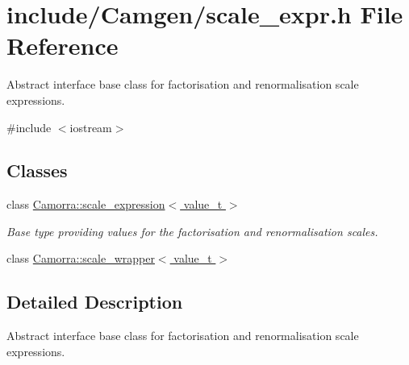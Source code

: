 \hypertarget{a00597}{
\section{include/Camgen/scale\_\-expr.h File Reference}
\label{a00597}
}


Abstract interface base class for factorisation and renormalisation scale expressions.  


{\ttfamily \#include $<$iostream$>$}\par
\subsection*{Classes}
\begin{DoxyCompactItemize}
\item 
class \hyperlink{a00447}{Camorra::scale\_\-expression$<$ value\_\-t $>$}
\begin{DoxyCompactList}\small\item\em Base type providing values for the factorisation and renormalisation scales. \end{DoxyCompactList}\item 
class \hyperlink{a00448}{Camorra::scale\_\-wrapper$<$ value\_\-t $>$}
\end{DoxyCompactItemize}


\subsection{Detailed Description}
Abstract interface base class for factorisation and renormalisation scale expressions. 